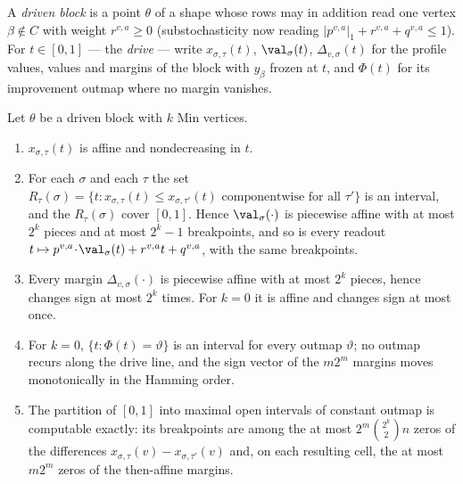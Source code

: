\begin{definition}\label{rs:def-drive}
A \emph{driven block} is a point $\theta$ of a shape whose rows may in
addition read one vertex $\beta\notin C$ with weight $r^{v,a}\ge0$
(substochasticity now reading $|p^{v,a}|_1+r^{v,a}+q^{v,a}\le1$). For
$t\in[0,1]$ --- the \emph{drive} --- write $x_{\sigma,\tau}(t)$,
$\val_\sigma(t)$, $\Delta_{v,\sigma}(t)$ for the profile values, values and
margins of the block with $y_\beta$ frozen at $t$, and $\Phi(t)$ for its
improvement outmap where no margin vanishes.
\end{definition}

\begin{theorem}\label{rs:drive}
Let $\theta$ be a driven block with $k$ Min vertices.
\begin{enumerate}[label=(\alph*),leftmargin=2.2em]
\item $x_{\sigma,\tau}(t)$ is affine and nondecreasing in $t$.
\item For each $\sigma$ and each $\tau$ the set
      $R_\tau(\sigma)=\{t: x_{\sigma,\tau}(t)\le x_{\sigma,\tau'}(t)
      \text{ componentwise for all }\tau'\}$ is an interval, and the
      $R_\tau(\sigma)$ cover $[0,1]$. Hence $\val_\sigma(\cdot)$ is piecewise
      affine with at most $2^{k}$ pieces and at most $2^{k}-1$ breakpoints,
      and so is every readout $t\mapsto p^{v,a}\!\cdot\!\val_\sigma(t)
      +r^{v,a}t+q^{v,a}$, with the same breakpoints.
\item Every margin $\Delta_{v,\sigma}(\cdot)$ is piecewise affine with at
      most $2^{k}$ pieces, hence changes sign at most $2^{k}$ times. For
      $k=0$ it is affine and changes sign at most once.
\item For $k=0$, $\{t:\Phi(t)=\vartheta\}$ is an interval for every outmap
      $\vartheta$; no outmap recurs along the drive line, and the sign vector
      of the $m2^{m}$ margins moves monotonically in the Hamming order.
\item The partition of $[0,1]$ into maximal open intervals of constant outmap
      is computable exactly: its breakpoints are among the at most
      $2^{m}\binom{2^{k}}{2}n$ zeros of the differences
      $x_{\sigma,\tau}(v)-x_{\sigma,\tau'}(v)$ and, on each resulting cell,
      the at most $m2^{m}$ zeros of the then-affine margins.
\end{enumerate}
\end{theorem}

